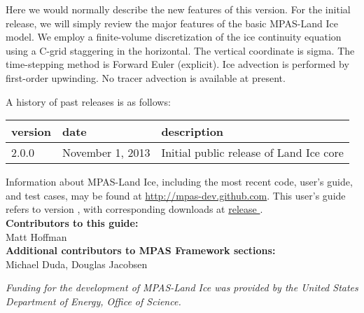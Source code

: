Here we would normally describe the new features of this version.  For the initial release, we will simply review the major features of the basic MPAS-Land Ice model.  We employ a finite-volume discretization of the ice continuity equation using a C-grid staggering in the horizontal.  The vertical coordinate is sigma.  The time-stepping method is Forward Euler (explicit).  Ice advection is performed by first-order upwinding.  No tracer advection is available at present.  


A history of past releases is as follows:

\begin{tabular}{lll} 
\hline\hline version & date & description  \\
\hline 
2.0.0 & November 1, 2013 & Initial public release of Land Ice core \\
\hline 
\end{tabular} 

Information about MPAS-Land Ice, including the most recent code, user's guide, and test cases, may be found at \url{http://mpas-dev.github.com}.  This user's guide refers to version \version, with corresponding downloads at \href{http://mpas-dev.github.com/landice/release_\version/release_\version.html}{release \version}. \\

\vspace{8pt}
\noindent
{\bf Contributors to this guide:}\\
Matt Hoffman\\
{\bf Additional contributors to MPAS Framework sections:}\\
Michael Duda, Douglas Jacobsen

\vspace{8pt}
\noindent
{\it Funding for the development of MPAS-Land Ice was provided by the United States Department of Energy, Office of Science.}





